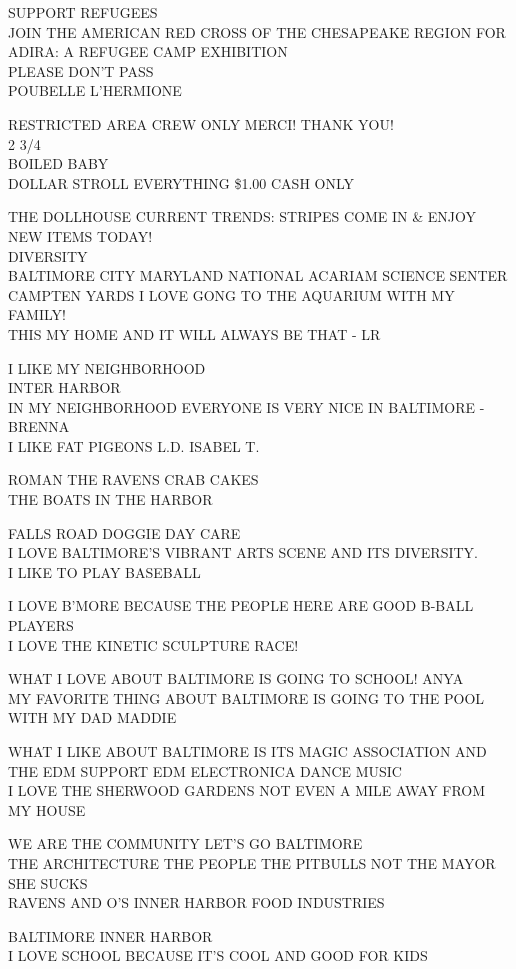 \documentclass[10pt,letterpaper]{article}
\begin{document}
SUPPORT REFUGEES\\
JOIN THE AMERICAN RED CROSS OF THE CHESAPEAKE REGION FOR ADIRA: A REFUGEE CAMP EXHIBITION\\
PLEASE DON'T PASS\\
POUBELLE L'HERMIONE

RESTRICTED AREA CREW ONLY MERCI!  THANK YOU!\\
2 3/4\\
BOILED BABY\\
DOLLAR STROLL EVERYTHING \$1.00 CASH ONLY

THE DOLLHOUSE CURRENT TRENDS: STRIPES COME IN \& ENJOY NEW ITEMS TODAY!\\
DIVERSITY\\
BALTIMORE CITY MARYLAND NATIONAL ACARIAM SCIENCE SENTER CAMPTEN YARDS I LOVE GONG TO THE AQUARIUM WITH MY FAMILY!\\
THIS MY HOME AND IT WILL ALWAYS BE THAT {-} LR

I LIKE MY NEIGHBORHOOD\\
INTER HARBOR\\
IN MY NEIGHBORHOOD EVERYONE IS VERY NICE IN BALTIMORE {-} BRENNA\\
I LIKE FAT PIGEONS L.D. ISABEL T.

ROMAN THE RAVENS CRAB CAKES\\
THE BOATS IN THE HARBOR

FALLS ROAD DOGGIE DAY CARE\\
I LOVE BALTIMORE'S VIBRANT ARTS SCENE AND ITS DIVERSITY.\\
I LIKE TO PLAY BASEBALL

I LOVE B'MORE BECAUSE THE PEOPLE HERE ARE GOOD B{-}BALL PLAYERS\\
I LOVE THE KINETIC SCULPTURE RACE!

WHAT I LOVE ABOUT BALTIMORE IS GOING TO SCHOOL!  ANYA\\
MY FAVORITE THING ABOUT BALTIMORE IS GOING TO THE POOL WITH MY DAD MADDIE

WHAT I LIKE ABOUT BALTIMORE IS ITS MAGIC ASSOCIATION AND THE EDM SUPPORT EDM ELECTRONICA DANCE MUSIC\\
I LOVE THE SHERWOOD GARDENS NOT EVEN A MILE AWAY FROM MY HOUSE

WE ARE THE COMMUNITY LET'S GO BALTIMORE\\
THE ARCHITECTURE THE PEOPLE THE PITBULLS NOT THE MAYOR SHE SUCKS\\
RAVENS AND O'S INNER HARBOR FOOD INDUSTRIES

BALTIMORE INNER HARBOR\\
I LOVE SCHOOL BECAUSE IT'S COOL AND GOOD FOR KIDS
\end{document}
